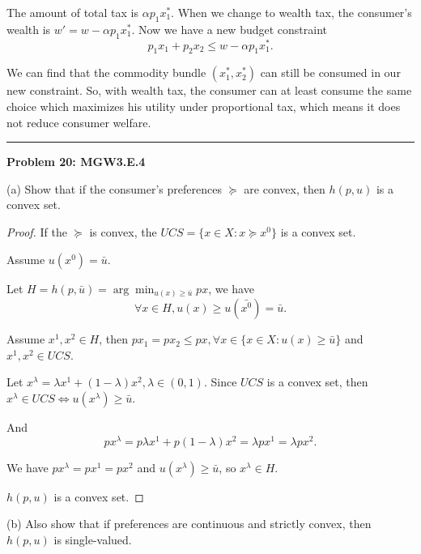 \documentclass[letterpaper, 11pt]{article}
\newcommand{\1}{\mathds{1}}	%
\theoremstyle{definition}
\begin{document}
The amount of total tax is $\alpha p_1 x_1^*$. When we change to wealth tax, the consumer's wealth is $w' = w - \alpha p_1 x_1^*$. Now we have a new budget constraint \[
    p_1x_1 + p_2x_2 \leq w - \alpha p_1 x_1^*.
\]

We can find that the commodity bundle $(x_1^*, x_2^*)$ can still be consumed in our new constraint. So, with wealth tax, the consumer can at least consume the same choice which maximizes his utility under proportional tax, which means it does not reduce consumer welfare.


\bigskip
\hrule
\bigskip

\textbf{Problem 20: MGW3.E.4}

(a) Show that if the consumer's preferences $\succeq $ are convex, then $h(p,u)$ is a convex set.


\begin{proof}
    If the $\succeq $ is convex, the $UCS = \{x \in X: x \succeq x^0\}$ is a convex set.

    Assume $u(x^0) = \bar{u}$.

    Let $H = h(p,\bar{u}) = \arg \min_{u(x) \geq \bar{u}} px$, we have \[
        \forall x \in H, u(x) \geq u(\bar{x^0}) = \bar{u}.
    \]

    Assume $x^1, x^2 \in H$, then $p x_1 = px_2 \leq px, \forall x \in \{x \in X: u(x) \geq \bar{u} \}$ and  $x^1, x^2 \in UCS$.

    Let $x^\lambda = \lambda x^1 + (1-\lambda)x^2, \lambda \in (0,1)$. Since $UCS$ is a convex set, then $x^\lambda \in UCS \iff u(x^\lambda) \geq \bar{u}$.

    And \[
        p x^\lambda = p \lambda x^1 +  p(1-\lambda)x^2 = \lambda px^1 = \lambda px^2.
    \]

    We have $px^\lambda = px^1 = px^2$ and $u(x^\lambda)\geq \bar{u}$, so $x^\lambda \in H$.

    $h(p,u)$ is a convex set.
\end{proof}



(b) Also show that if preferences are continuous and strictly convex, then $h(p,u)$ is single-valued.
\end{document}

